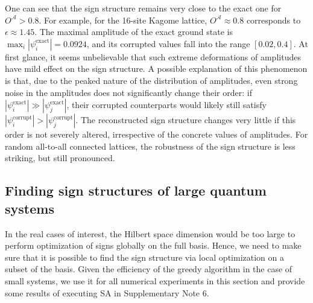 \noindent One can see that the sign structure remains very close to the exact one for $O^\mathcal{A} > 0.8$. For example, for the 16-site Kagome lattice, $O^\mathcal{A} \approx 0.8$ corresponds to $\epsilon \approx 1.45$. The maximal amplitude of the exact ground state is $\max_i |\psi^\mathrm{exact}_i| = 0.0924$, and its corrupted values fall into the range $[0.02, 0.4]$. At first glance, it seems unbelievable that such extreme deformations of amplitudes have mild effect on the sign structure. A possible explanation of this phenomenon is that, due to the peaked nature of the distribution of amplitudes, even strong noise in the amplitudes does not significantly change their order: if $|\psi^\mathrm{exact}_i| \gg |\psi^\mathrm{exact}_j|$, their corrupted counterparts would likely still satisfy $|\psi^\mathrm{corrupt}_i| > |\psi^\mathrm{corrupt}_j|$. The reconstructed sign structure changes very little if this order is not severely altered, irrespective of the concrete values of amplitudes. For random all-to-all connected lattices, the robustness of the sign structure is less striking, but still pronounced.


\subsection{Finding sign structures of large quantum systems}

In the real cases of interest, the Hilbert space dimension would be too large to perform optimization of signs globally on the full basis. Hence, we need to make sure that it is possible to find the sign structure via local optimization on a subset of the basis. Given the efficiency of the greedy algorithm in the case of small systems, we use it for all numerical experiments in this section and provide some results of executing SA in Supplementary Note 6.

